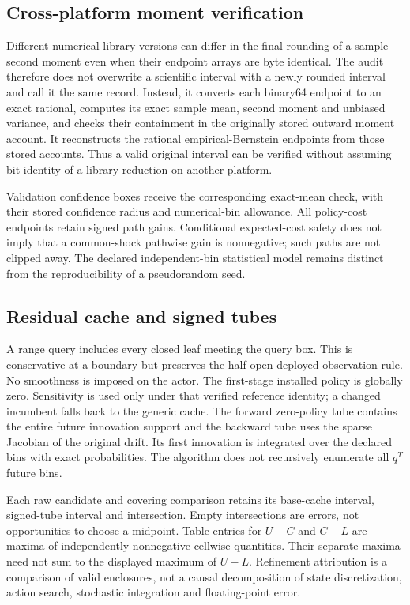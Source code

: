 \subsection{Cross-platform moment verification}
Different numerical-library versions can differ in the final rounding of a sample second moment even when their endpoint arrays are byte identical. The audit therefore does not overwrite a scientific interval with a newly rounded interval and call it the same record. Instead, it converts each binary64 endpoint to an exact rational, computes its exact sample mean, second moment and unbiased variance, and checks their containment in the originally stored outward moment account. It reconstructs the rational empirical-Bernstein endpoints from those stored accounts. Thus a valid original interval can be verified without assuming bit identity of a library reduction on another platform.

Validation confidence boxes receive the corresponding exact-mean check, with their stored confidence radius and numerical-bin allowance. All policy-cost endpoints retain signed path gains. Conditional expected-cost safety does not imply that a common-shock pathwise gain is nonnegative; such paths are not clipped away. The declared independent-bin statistical model remains distinct from the reproducibility of a pseudorandom seed.

\subsection{Residual cache and signed tubes}
A range query includes every closed leaf meeting the query box. This is conservative at a boundary but preserves the half-open deployed observation rule. No smoothness is imposed on the actor. The first-stage installed policy is globally zero. Sensitivity is used only under that verified reference identity; a changed incumbent falls back to the generic cache. The forward zero-policy tube contains the entire future innovation support and the backward tube uses the sparse Jacobian of the original drift. Its first innovation is integrated over the declared bins with exact probabilities. The algorithm does not recursively enumerate all $q^T$ future bins.

Each raw candidate and covering comparison retains its base-cache interval, signed-tube interval and intersection. Empty intersections are errors, not opportunities to choose a midpoint. Table entries for $U-C$ and $C-L$ are maxima of independently nonnegative cellwise quantities. Their separate maxima need not sum to the displayed maximum of $U-L$. Refinement attribution is a comparison of valid enclosures, not a causal decomposition of state discretization, action search, stochastic integration and floating-point error.

